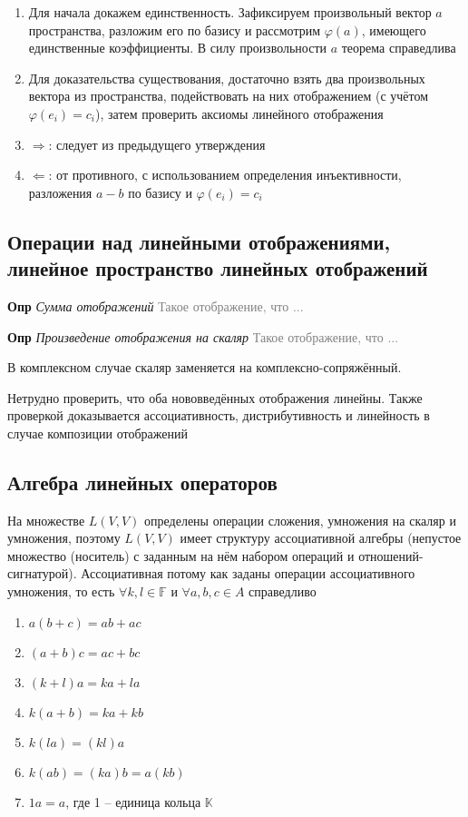 \begin{enumerate}
    \item Для начала докажем единственность.
    Зафиксируем произвольный вектор $a$ пространства, разложим его по базису и рассмотрим $\varphi (a)$, имеющего
    единственные коэффициенты.
    В силу произвольности $a$ теорема справедлива
    \item Для доказательства существования, достаточно взять два произвольных вектора из пространства,
    подействовать на них отображением (с учётом $\varphi(e_i) = c_i$), затем проверить аксиомы линейного отображения
    \item $\Rightarrow$: следует из предыдущего утверждения
    \item $\Leftarrow$: от противного, с использованием определения инъективности, разложения $a - b$ по базису и
    $\varphi(e_i) = c_i$
\end{enumerate}

\subsection{Операции над линейными отображениями, линейное пространство линейных отображений}

\textbf{Опр} \textit{Сумма отображений} \textcolor{gray}{Такое отображение, что ...}

\textbf{Опр} \textit{Произведение отображения на скаляр} \textcolor{gray}{Такое отображение, что ...}

В комплексном случае скаляр заменяется на комплексно-сопряжённый.

Нетрудно проверить, что оба нововведённых отображения линейны.
Также проверкой доказывается ассоциативность, дистрибутивность и линейность в случае композиции отображений

\subsection{Алгебра линейных операторов}

На множестве $L(V, V)$ определены операции сложения, умножения на скаляр и умножения, поэтому $L(V, V)$ имеет
структуру ассоциативной алгебры (непустое множество (носитель) с заданным на нём набором операций и
отношений-сигнатурой).
Ассоциативная потому как заданы операции ассоциативного умножения, то есть $\forall k, l \in \mathbb{F}$ и
$\forall a, b, c \in A$ справедливо

\begin{enumerate}
    \item $a(b + c) = ab + ac$
    \item $(a + b)c = ac + bc$
    \item $(k+l)a = ka + la$
    \item $k(a + b) = ka + kb$
    \item $k(la) = (kl)a$
    \item $k(ab) = (ka)b = a(kb)$
    \item $1a = a$, где 1 -- единица кольца $\mathbb{K}$
\end{enumerate}

